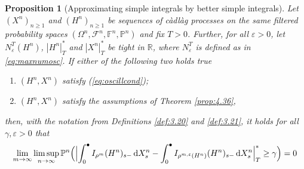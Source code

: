 \documentclass[11pt]{article}
\newtheorem{prop}[theorem]{Proposition}
\theoremstyle{definition}\newtheorem{example}[theorem]{Example}
\theoremstyle{definition}\newtheorem{counterexample}[theorem]{Counterexample}
\theoremstyle{definition}\newtheorem{remark}[theorem]{Remark}
\theoremstyle{definition}\newtheorem{defi}[theorem]{Definition}
\numberwithin{equation}{section}
\newcommand{\R}{\mathbb{R}}
\newcommand{\F}{\mathbb{F}}											%
\newcommand*\diff{\mathop{}\!\mathrm{d}}								%
\newcommand{\Pro}{\mathbb{P}}										%
\renewcommand{\|}{\; : \, \;}											%
\begin{document}
\begin{prop}[Approximating simple integrals by better simple integrals] \label{prop:3.22} 
	Let $(X^n)_{n\ge 1}$ and $(H^n)_{n\ge 1}$ be sequences of càdlàg processes on the same filtered probability spaces $(\Omega^n, \mathcal{F}^n, \F^n, \Pro^n)$ and fix $T>0$. Further, for all $\varepsilon>0$, let $N^T_\varepsilon(H^n)$, $|H^n|^*_T$ and $|X^n|^*_T$ be tight in $\R$, where $N^T_\varepsilon$ is defined as in \eqref{eq:maxnumosc}. If either of the following two holds true
	\begin{enumerate}
		\item $(H^n, X^n)$ satisfy (\ref{eq:oscillcond});
		\item $(H^n, X^n)$ satisfy the assumptions of Theorem \ref{prop:4.36},
	\end{enumerate}
	then, with the notation from Definitions \ref{def:3.20} and \ref{def:3.21}, it holds for all $\gamma,\varepsilon>0$ that
	\begin{align}
		\lim\limits_{m \to \infty} \limsup\limits_{n\to \infty}   \Pro^n \Bigl(  \Bigl| \int_0^\bullet  I_{\rho^m}(H^n)_{s-}  \diff X^n_s  -  \int_0^\bullet  I_{\rho^{m,\varepsilon}(H^n)}(H^n)_{s-}  \diff X^n_s \Bigr|_T^* \ge  \gamma \Bigr)  =  0 \label{eq:approx_simpleint_by_better_simpleint}
	\end{align}
\end{prop}
\end{document}
